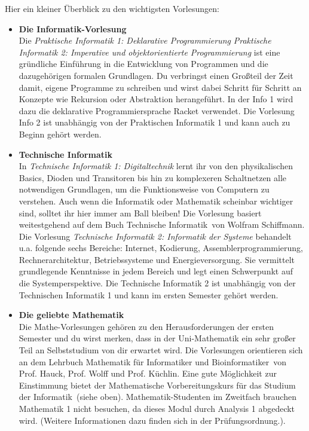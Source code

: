 \ifbachelor
	Hier ein kleiner Überblick zu den wichtigsten Vorlesungen:
	\begin{itemize}
		\item
		\textbf{Die Informatik-Vorlesung} \\
		Die
		\ifwintersemester \emph{Praktische Informatik 1: Deklarative Programmierung} \fi
		\ifsommersemester \emph{Praktische Informatik 2: Imperative und objektorientierte Programmierung} \fi
		ist eine gründliche Einführung in die Entwicklung von Programmen und die dazugehörigen formalen Grundlagen.
		Du verbringst einen Großteil der Zeit damit, eigene Programme zu schreiben und wirst dabei Schritt für Schritt
		an Konzepte wie Rekursion oder Abstraktion herangeführt.
		\ifwintersemester In der Info 1 wird dazu die deklarative Programmiersprache Racket verwendet. \fi
		\ifsommersemester Die Vorlesung Info 2 ist unabhängig von der Praktischen Informatik 1 und kann auch zu Beginn gehört werden. \fi

		\ifinfo
			\item
			\textbf{Technische Informatik} \\
			\ifwintersemester
				In \emph{Technische Informatik 1: Digitaltechnik} lernt ihr von den physikalischen Basics, Dioden und Transitoren bis hin zu komplexeren Schaltnetzen alle notwendigen Grundlagen,
				um die Funktionsweise von Computern zu verstehen. Auch wenn die Informatik oder Mathematik scheinbar wichtiger sind, solltet ihr hier immer am Ball bleiben!
				Die Vorlesung basiert weitestgehend auf dem Buch \glqq Technische Informatik\grqq \ von Wolfram Schiffmann.
			\fi
			\ifsommersemester
				Die Vorlesung \emph{Technische Informatik 2: Informatik der Systeme} behandelt u.a. folgende sechs Bereiche: Internet, Kodierung, Assemblerprogrammierung, Rechnerarchitektur, Betriebssysteme
				und Energieversorgung. Sie vermittelt grundlegende Kenntnisse in jedem Bereich und legt einen Schwerpunkt auf die Systemperspektive. Die Technische Informatik 2 ist unabhängig von
				der Technischen Informatik 1 und kann im ersten Semester gehört werden.
			\fi
		\fi

		\item
		\textbf{Die geliebte Mathematik} \\
		Die Mathe-Vorlesungen gehören zu den Herausforderungen der ersten Semester und du wirst merken, dass in der Uni-Mathematik ein sehr großer Teil an Selbststudium von dir erwartet wird.
		Die Vorlesungen orientieren sich an dem Lehrbuch \glqq Mathematik für Informatiker und Bioinformatiker\grqq \ von Prof. Hauck, Prof. Wolff und Prof. Küchlin. Eine gute Möglichkeit zur
		Einstimmung bietet der \glqq Mathematische Vorbereitungskurs für das Studium der Informatik\grqq  \ (siehe oben).
		\iflehramt
			Mathematik-Studenten im Zweitfach brauchen Mathematik 1 nicht besuchen, da dieses Modul durch Analysis 1 abgedeckt wird. 
			(Weitere Informationen dazu finden sich in der Prüfungsordnung.).
		\fi
	\end{itemize}
\fi

